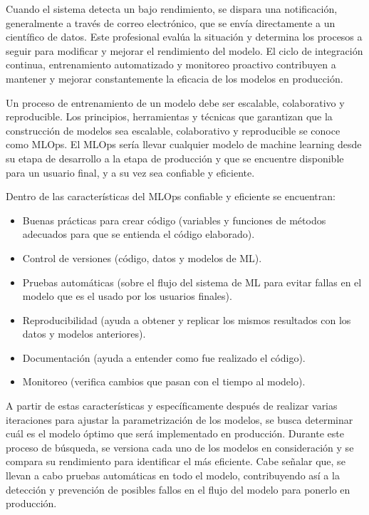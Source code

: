 Cuando el sistema detecta un bajo rendimiento, se dispara una notificación, generalmente a través de correo electrónico, que se envía directamente a un científico de datos. Este profesional evalúa la situación y determina los procesos a seguir para modificar y mejorar el rendimiento del modelo. El ciclo de integración continua, entrenamiento automatizado y monitoreo proactivo contribuyen a mantener y mejorar constantemente la eficacia de los modelos en producción. \newline

Un proceso de entrenamiento de un modelo debe ser escalable, colaborativo y reproducible. Los principios, herramientas y técnicas que garantizan que la construcción de modelos sea escalable, colaborativo y reproducible se conoce como MLOps. El MLOps sería llevar cualquier modelo de machine learning desde su etapa de desarrollo a la etapa de producción y que se encuentre disponible para un usuario final, y a su vez sea confiable y eficiente.

Dentro de las características del MLOps confiable y eficiente se encuentran:

\begin{itemize}
    \item Buenas prácticas para crear código (variables y funciones de métodos adecuados para que se entienda el código elaborado).
    \item Control de versiones (código, datos y modelos de ML).
    \item Pruebas automáticas (sobre el flujo del sistema de ML para evitar fallas en el modelo que es el usado por los usuarios finales).
    \item Reproducibilidad (ayuda a obtener y replicar los mismos resultados con los datos y modelos anteriores).
    \item Documentación (ayuda a entender como fue realizado el código).
    \item Monitoreo (verifica cambios que pasan con el tiempo al modelo).
\end{itemize}

A partir de estas características y específicamente después de realizar varias iteraciones para ajustar la parametrización de los modelos, se busca determinar cuál es el modelo óptimo que será implementado en producción. Durante este proceso de búsqueda, se versiona cada uno de los modelos en consideración y se compara su rendimiento para identificar el más eficiente. Cabe señalar que, se llevan a cabo pruebas automáticas en todo el modelo, contribuyendo así a la detección y prevención de posibles fallos en el flujo del modelo para ponerlo en producción. \newline

